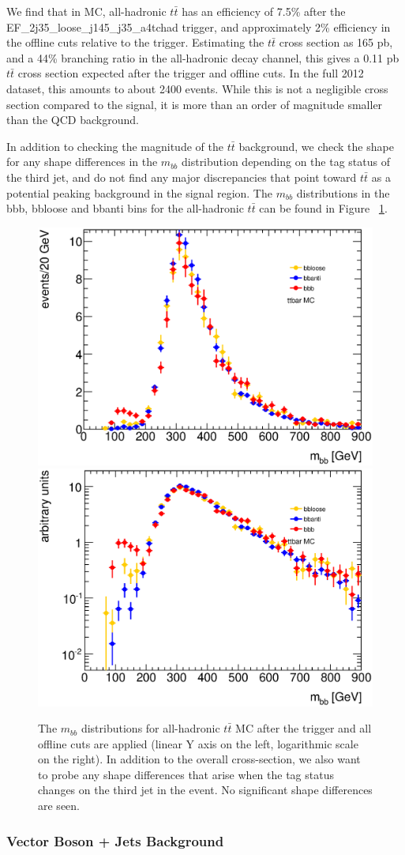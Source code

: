 We find that in MC, all-hadronic $t\bar{t}$ has an efficiency of 7.5\% after
the EF\_2j35\_loose\_j145\_j35\_a4tchad trigger, and approximately 2\% efficiency
in the offline cuts relative to the trigger.  Estimating the $t\bar{t}$ cross section
as 165 pb, and a 44\% branching ratio in the all-hadronic decay channel, this gives
a 0.11 pb $t\bar{t}$ cross section expected after the trigger and offline cuts.  In the
full 2012 dataset, this amounts to about 2400 events.  While
this is not a negligible cross section compared to the signal, it is more than an
order of magnitude smaller than the QCD background.

In addition to checking the magnitude of the $t\bar{t}$ background, we check the shape
for any shape differences in the $m_{bb}$ distribution depending on the tag status of the
third jet, and do not find any major discrepancies that point toward $t\bar{t}$ as a
potential peaking background in the signal region. The $m_{bb}$ distributions in the
bbb, bbloose and bbanti bins for the all-hadronic $t\bar{t}$ can be found in Figure
~\ref{fig:ttbar_mbb}.




\begin{figure}[hbt]
\includegraphics[width=0.45\linewidth]{BackgroundEstimation/images/mbb_compare_bbb_bbloose_bbanti_ttbar.eps}
\includegraphics[width=0.45\linewidth]{BackgroundEstimation/images/mbb_compare_bbb_bbloose_bbanti_ttbar_logy.eps}
\caption{The $m_{bb}$ distributions for all-hadronic $t\bar{t}$ MC after the trigger and all offline cuts are applied (linear Y axis on the left, logarithmic scale on the right).  In addition to the overall cross-section, we also want to probe any shape differences that arise when the tag status changes on the third jet in the event.  No significant shape differences are seen.}
\label{fig:ttbar_mbb}
\end{figure}



              \subsubsection{Vector Boson + Jets Background}
